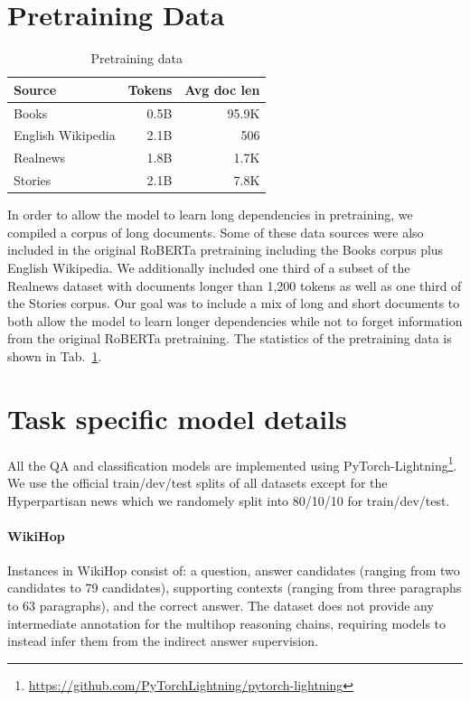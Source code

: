 \documentclass[11pt,a4paper]{article}
\begin{document}
\section{Pretraining Data}
\label{sec:mlm_data}

\begin{table}[t]
\centering
\small
\begin{tabular}{@{}lrr@{}}
\toprule
Source    & Tokens & Avg doc len \\ \midrule
Books \cite{Zhu2015AligningBA}    & 0.5B              & 95.9K\\
English Wikipedia & 2.1B              & 506 \\
Realnews \cite{Zellers2019DefendingAN}  & 1.8B              & 1.7K\\
Stories \cite{Trinh2018ASM}  & 2.1B              & 7.8K \\ \bottomrule
\end{tabular}
\caption{Pretraining data}\label{tab:pretrain-data}
\end{table}

In order to allow the model to learn long dependencies in pretraining, we compiled a corpus of long documents. Some of these data sources were also included in the original RoBERTa pretraining including the Books corpus \cite{Zhu2015AligningBA} plus English Wikipedia. We additionally included one third of a subset of the Realnews dataset \cite{Zellers2019DefendingAN} with documents longer than 1,200 tokens as well as one third of the Stories \cite{Trinh2018ASM} corpus. Our goal was to include a mix of long and short documents to both allow the model to learn longer dependencies while not to forget information from the original RoBERTa pretraining. The statistics of the pretraining data is shown in Tab.~\ref{tab:pretrain-data}.

\section{Task specific model details}
All the QA and classification models are implemented using PyTorch-Lightning\footnote{\url{https://github.com/PyTorchLightning/pytorch-lightning}}.  We use the official train/dev/test splits of all datasets except for the Hyperpartisan news which we randomely split into 80/10/10 for train/dev/test.

\label{sec:taskdetails}

\paragraph{WikiHop} Instances in WikiHop consist of: a question, answer candidates (ranging from two candidates to 79 candidates), supporting contexts (ranging from three paragraphs to 63 paragraphs), and the correct answer.  The dataset does not provide any intermediate annotation for the multihop reasoning chains, requiring models to instead infer them from the indirect answer supervision.
\end{document}
